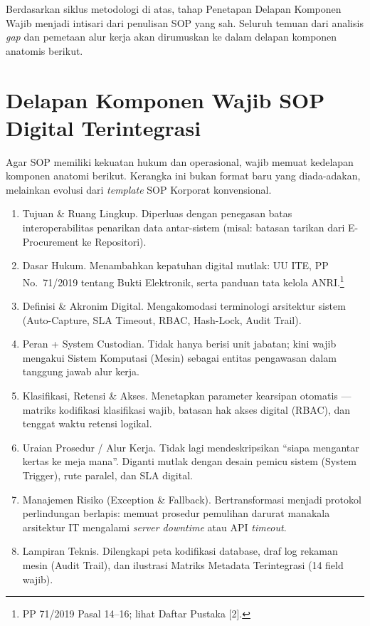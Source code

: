 \documentclass[12pt,a4paper]{report}
\begin{document}
Berdasarkan siklus metodologi di atas, tahap Penetapan Delapan Komponen Wajib menjadi intisari dari penulisan SOP yang sah. Seluruh temuan dari analisis \textit{gap} dan pemetaan alur kerja akan dirumuskan ke dalam delapan komponen anatomis berikut.


\section{Delapan Komponen Wajib SOP Digital Terintegrasi}
Agar SOP memiliki kekuatan hukum dan operasional, wajib memuat kedelapan komponen anatomi berikut. Kerangka ini bukan format baru yang diada-adakan, melainkan evolusi dari \textit{template} SOP Korporat konvensional.

\begin{enumerate}[leftmargin=*]
    \item Tujuan \& Ruang Lingkup. Diperluas dengan penegasan batas interoperabilitas penarikan data antar-sistem (misal: batasan tarikan dari E-Procurement ke Repositori).
    \item Dasar Hukum. Menambahkan kepatuhan digital mutlak: UU ITE, PP No.~71/2019 tentang Bukti Elektronik, serta panduan tata kelola ANRI.\footnote{PP 71/2019 Pasal 14--16; lihat Daftar Pustaka [2].}
    \item Definisi \& Akronim Digital. Mengakomodasi terminologi arsitektur sistem (Auto-Capture, SLA Timeout, RBAC, Hash-Lock, Audit Trail).
    \item Peran + System Custodian. Tidak hanya berisi unit jabatan; kini wajib mengakui Sistem Komputasi (Mesin) sebagai entitas pengawasan dalam tanggung jawab alur kerja.
    \item Klasifikasi, Retensi \& Akses. Menetapkan parameter kearsipan otomatis --- matriks kodifikasi klasifikasi wajib, batasan hak akses digital (RBAC), dan tenggat waktu retensi logikal.
    \item Uraian Prosedur / Alur Kerja. Tidak lagi mendeskripsikan ``siapa mengantar kertas ke meja mana''. Diganti mutlak dengan desain pemicu sistem (System Trigger), rute paralel, dan SLA digital.
    \item Manajemen Risiko (Exception \& Fallback). Bertransformasi menjadi protokol perlindungan berlapis: memuat prosedur pemulihan darurat manakala arsitektur IT mengalami \textit{server downtime} atau API \textit{timeout}.
    \item Lampiran Teknis. Dilengkapi peta kodifikasi database, draf log rekaman mesin (Audit Trail), dan ilustrasi Matriks Metadata Terintegrasi (14 field wajib).
\end{enumerate}
\end{document}

